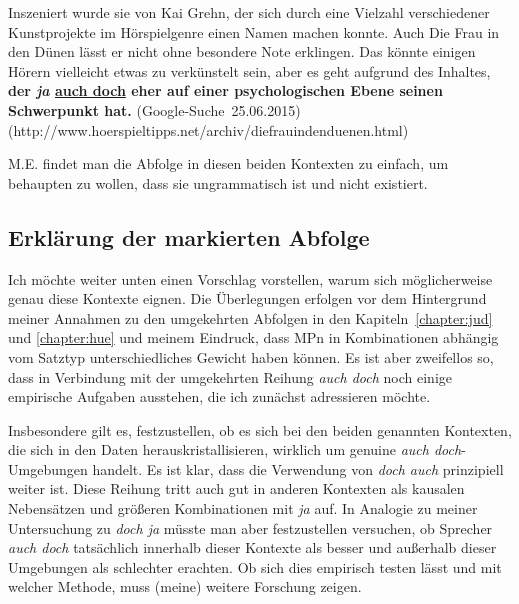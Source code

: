 {\begin{exe}
	\ex\label{1194} 
	\scriptsize
	Inszeniert wurde sie von Kai Grehn, der sich durch eine Vielzahl verschiedener Kunstprojekte im Hörspielgenre einen Namen machen konnte. Auch \glqq Die 	Frau in den Dünen\grqq{} lässt er nicht ohne besondere Note erklingen. Das könnte einigen Hörern vielleicht etwas zu verkünstelt sein, aber es geht 		aufgrund des Inhaltes, \textbf{der \textit{ja} \underline{auch doch} eher auf einer psychologischen Ebene seinen \\ Schwerpunkt hat.}						
	\hfill\hbox{(Google-Suche 25.06.2015)}	
	\newline
	\hbox{}\hfill\hbox{(http://www.hoerspieltipps.net/archiv/diefrauindenduenen.html)}
\end{exe}					            
M.E. findet man die Abfolge in diesen beiden Kontexten zu einfach, um behaupten zu wollen, dass sie ungrammatisch ist und nicht existiert.

\subsection{Erklärung der markierten Abfolge}
Ich möchte weiter unten einen Vorschlag vorstellen, warum sich möglicherweise genau diese Kontexte eignen. Die Überlegungen erfolgen vor dem Hintergrund meiner Annahmen zu den umgekehrten Abfolgen in den Kapiteln~\ref{chapter:jud} und \ref{chapter:hue} und meinem Eindruck, dass MPn in Kombinationen abhängig vom Satztyp unterschiedliches Gewicht haben können. Es ist aber zweifellos so, dass in Verbindung mit der umgekehrten Reihung \textit{auch doch} noch einige empirische Aufgaben ausstehen, die ich zunächst adressieren möchte.

Insbesondere gilt es, festzustellen, ob es sich bei den beiden genannten Kontexten, die sich in den Daten herauskristallisieren, wirklich um genuine \textit{auch doch}-Umgebungen handelt. Es ist klar, dass die Verwendung von \textit{doch auch} prinzi\-piell weiter ist. Diese Reihung tritt auch gut in anderen Kontexten als kausalen Nebensätzen und größeren Kombinationen mit \textit{ja} auf. In Analogie zu meiner Untersuchung zu \textit{doch ja} müsste man aber festzustellen versuchen, ob Sprecher \textit{auch doch} tatsächlich innerhalb dieser Kontexte als besser und außerhalb dieser Umgebungen als schlechter erachten. Ob sich dies empirisch testen lässt und mit welcher Methode, muss (meine) weitere Forschung zeigen.

}
